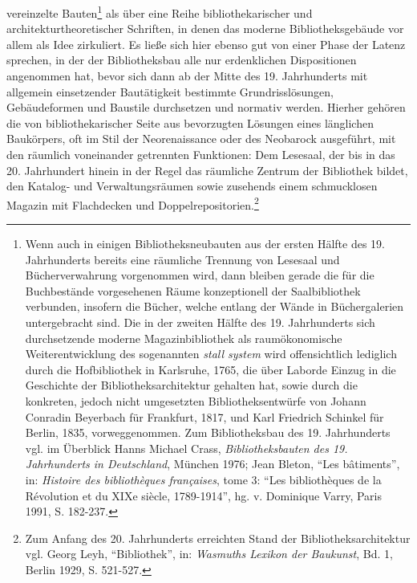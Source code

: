 vereinzelte Bauten\footnote{Wenn auch in einigen Bibliotheksneubauten
  aus der ersten Hälfte des 19. Jahrhunderts bereits eine räumliche
  Trennung von Lesesaal und Bücherverwahrung vorgenommen wird, dann
  bleiben gerade die für die Buchbestände vorgesehenen Räume
  konzeptionell der Saalbibliothek verbunden, insofern die Bücher,
  welche entlang der Wände in Büchergalerien untergebracht sind. Die in
  der zweiten Hälfte des 19. Jahrhunderts sich durchsetzende moderne
  Magazinbibliothek als raumökonomische Weiterentwicklung des
  sogenannten \emph{stall system} wird offensichtlich lediglich durch
  die Hofbibliothek in Karlsruhe, 1765, die über Laborde Einzug in die
  Geschichte der Bibliotheksarchitektur gehalten hat, sowie durch die
  konkreten, jedoch nicht umgesetzten Bibliotheksentwürfe von Johann
  Conradin Beyerbach für Frankfurt, 1817, und Karl Friedrich Schinkel
  für Berlin, 1835, vorweggenommen. Zum Bibliotheksbau des 19.
  Jahrhunderts vgl. im Überblick Hanns Michael Crass,
  \emph{Bibliotheksbauten des 19. Jahrhunderts in Deutschland}, München
  1976; Jean Bleton, \enquote{Les bâtiments}, in: \emph{Histoire des
  bibliothèques françaises}, tome 3: \enquote{Les bibliothèques de la
  Révolution et du XIXe siècle, 1789-1914}, hg. v. Dominique Varry,
  Paris 1991, S. 182-237.} als über eine Reihe bibliothekarischer und
architekturtheoretischer Schriften, in denen das moderne
Bibliotheksgebäude vor allem als Idee zirkuliert. Es ließe sich hier
ebenso gut von einer Phase der Latenz sprechen, in der der
Bibliotheksbau alle nur erdenklichen Dispositionen angenommen hat, bevor
sich dann ab der Mitte des 19. Jahrhunderts mit allgemein einsetzender
Bautätigkeit bestimmte Grundrisslösungen, Gebäudeformen und Baustile
durchsetzen und normativ werden. Hierher gehören die von
bibliothekarischer Seite aus bevorzugten Lösungen eines länglichen
Baukörpers, oft im Stil der Neorenaissance oder des Neobarock
ausgeführt, mit den räumlich voneinander getrennten Funktionen: Dem
Lesesaal, der bis in das 20. Jahrhundert hinein in der Regel das
räumliche Zentrum der Bibliothek bildet, den Katalog- und
Verwaltungsräumen sowie zusehends einem schmucklosen Magazin mit
Flachdecken und Doppelrepositorien.\footnote{Zum Anfang des 20.
  Jahrhunderts erreichten Stand der Bibliotheksarchitektur vgl. Georg
  Leyh, \enquote{Bibliothek}, in: \emph{Wasmuths Lexikon der Baukunst},
  Bd. 1, Berlin 1929, S. 521-527.}

